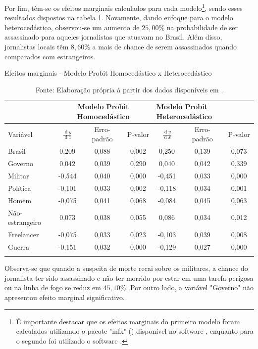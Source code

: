 \documentclass[12pt,
               openright,
               oneside,
               a4paper,
							 section=TITLE,     %
               subsection=Title,  %
               english,brazil]{article}
\begin{document}
Por fim, têm-se os efeitos marginais calculados para cada modelo\footnote[9]{É importante destacar que os efeitos marginais do primeiro modelo foram calculados utilizando o pacote "mfx" () disponível no software , enquanto para o segundo foi utilizado o software \cite{Stata14}.}, sendo esses resultados dispostos na tabela \ref{tab:efeitos_marginais}. Novamente, dando enfoque para o modelo heterocedástico, observou-se um aumento de $25,00\%$ na probabilidade de ser assassinado para aqueles jornalistas que atuavam no Brasil. Além disso, jornalistas locais têm $8,60\%$ a mais de chance de serem assassinados quando comparados com estrangeiros.

\begin{table}[H]
\centering
\caption{Efeitos marginais - Modelo Probit Homocedástico x Heterocedástico}
\label{tab:efeitos_marginais}
\begin{tabular}{lcccccc}
 & \multicolumn{3}{c}{Modelo Probit Homocedástico} & \multicolumn{3}{l}{Modelo Probit Heterocedástico} \\ \midrule
Variável & \multicolumn{1}{c}{$\frac{\operatorname{d}y}{\operatorname{d}x}$} & \multicolumn{1}{c}{Erro-padrão} & P-valor & \multicolumn{1}{c}{$\frac{\operatorname{d}y}{\operatorname{d}x}$} & \multicolumn{1}{c}{Erro-padrão} & P-valor \\ \midrule
Brasil & 0,209 & 0,088 & 0,002 & 0,250 & 0,139 & 0,073 \\
Governo & 0,042 & 0,039 & 0,290 & 0,040 & 0,042 & 0,339 \\
Militar & -0,544 & 0,040 & 0,000 & -0,451 & 0,033 & 0,000 \\
Política & -0,101 & 0,033 & 0,002 & -0,118 & 0,034 & 0,001 \\
Homem & -0,075 & 0,041 & 0,068 & -0,084 & 0,045 & 0,063 \\
Não-estrangeiro & 0,073 & 0,038 & 0,055 & 0,086 & 0,034 & 0,012 \\
Freelancer & -0,075 & 0,033 & 0,023 & -0,103 & 0,039 & 0,008 \\
Guerra & -0,151 & 0,032 & 0,000 & -0,129 & 0,027 & 0,000 \\ \bottomrule \\
\end{tabular}
\caption*{Fonte: Elaboração própria à partir dos dados disponíveis em \cite{CPJ2020}.}
\end{table}

Observa-se que quando a suspeita de morte recai sobre os militares, a chance do jornalista ter sido assassinado e não ter morrido por estar em uma tarefa perigosa ou na linha de fogo se reduz em $45,10\%$. Por outro lado, a variável "Governo" não apresentou efeito marginal significativo.
\end{document}

